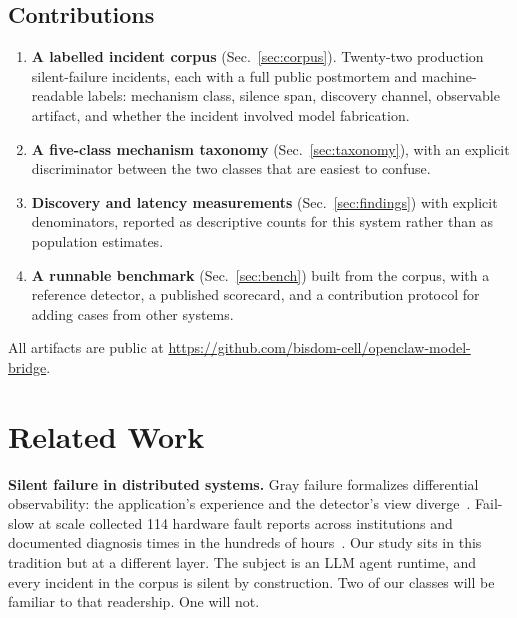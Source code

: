 \documentclass[conference]{IEEEtran}
\begin{document}
\subsection{Contributions}

\begin{enumerate}
  \item \textbf{A labelled incident corpus} (Sec.~\ref{sec:corpus}).
        Twenty-two production silent-failure incidents, each with a full
        public postmortem and machine-readable labels: mechanism class,
        silence span, discovery channel, observable artifact, and whether
        the incident involved model fabrication.
  \item \textbf{A five-class mechanism taxonomy}
        (Sec.~\ref{sec:taxonomy}), with an explicit discriminator between
        the two classes that are easiest to confuse.
  \item \textbf{Discovery and latency measurements}
        (Sec.~\ref{sec:findings}) with explicit denominators, reported as
        descriptive counts for this system rather than as population
        estimates.
  \item \textbf{A runnable benchmark} (Sec.~\ref{sec:bench}) built from the
        corpus, with a reference detector, a published scorecard, and a
        contribution protocol for adding cases from other systems.
\end{enumerate}

All artifacts are public at
\url{https://github.com/bisdom-cell/openclaw-model-bridge}.

\section{Related Work}

\textbf{Silent failure in distributed systems.} Gray failure formalizes
differential observability: the application's experience and the detector's
view diverge~\cite{huang2017gray}. Fail-slow at scale collected 114 hardware
fault reports across institutions and documented diagnosis times in the
hundreds of hours~\cite{gunawi2018failslow}. Our study sits in this
tradition but at a different layer. The subject is an LLM agent runtime, and
every incident in the corpus is silent by construction. Two of our classes
will be familiar to that readership. One will not.
\end{document}
